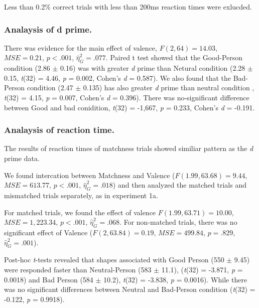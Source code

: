 \documentclass[man]{apa6}
\begin{document}
Less than 0.2\% correct trials with less than 200ms reaction times were exlucded.

\hypertarget{analaysis-of-d-prime.-2}{%
\subsubsection{Analaysis of d prime.}\label{analaysis-of-d-prime.-2}}

There was evidence for the main effect of valence, \(F(2, 64) = 14.03\), \(\mathit{MSE} = 0.21\), \(p < .001\), \(\hat{\eta}^2_G = .077\). Paired t test showed that the Good-Person condition (2.86 \(\pm\) 0.16) was with greater \emph{d} prime than Netural condition (2.28 \(\pm\) 0.15, \emph{t}(32) = 4.46, \emph{p} = 0.002, Cohen's \emph{d} = 0.587). We also found that the Bad-Person condition (2.47 \(\pm\) 0.135) has also greater \emph{d} prime than neutral condition , \emph{t}(32) = 4.15, \emph{p} = 0.007, Cohen's \emph{d} = 0.396). There was no-significant difference between Good and bad conidition, \emph{t}(32) = -1,667, \emph{p} = 0.233, Cohen's \emph{d} = -0.191.

\hypertarget{analaysis-of-reaction-time.-2}{%
\subsubsection{Analaysis of reaction time.}\label{analaysis-of-reaction-time.-2}}

The results of reaction times of matchness trials showed similiar pattern as the \emph{d} prime data.

We found intercation between Matchness and Valence (\(F(1.99, 63.68) = 9.44\), \(\mathit{MSE} = 613.77\), \(p < .001\), \(\hat{\eta}^2_G = .018\)) and then analyzed the matched trials and mismatched trials separately, as in experiment 1a.

For matched trials, we found the effect of valence \(F(1.99, 63.71) = 10.00\), \(\mathit{MSE} = 1,223.34\), \(p < .001\), \(\hat{\eta}^2_G = .068\). For non-matched trials, there was no significant effect of Valence (\(F(2, 63.84) = 0.19\), \(\mathit{MSE} = 499.84\), \(p = .829\), \(\hat{\eta}^2_G = .001\)).

Post-hoc \emph{t}-tests revealed that shapes associated with Good Person (550 \(\pm\) 9.45) were responded faster than Neutral-Person (583 \(\pm\) 11.1), (\emph{t}(32) = -3.871, \emph{p} = 0.0018) and Bad Person (584 \(\pm\) 10.2), \emph{t}(32) = -3.838, \emph{p} = 0.0016). While there was no significant differences between Neutral and Bad-Person condition (\emph{t}(32) = -0.122, \emph{p} = 0.9918).
\end{document}
